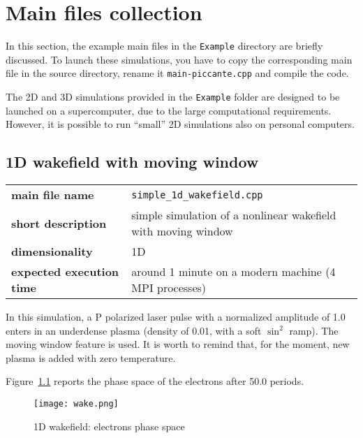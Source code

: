 \documentclass[11pt,a4paper]{report}
\begin{document}
\chapter{Main files collection}
In this section, the example main files in the \verb+Example+ directory are briefly discussed. To launch these simulations, you have to copy the corresponding main file in the source directory, rename it \verb+main-piccante.cpp+ and compile the code.

The 2D and 3D simulations provided in the \verb+Example+ folder are designed to be launched on a supercomputer, due to the large computational requirements. However, it is possible to run ``small'' 2D simulations also on personal computers.

\section{1D wakefield with moving window}
\begin{center}
    \begin{tabular}{ l l }
    	\textbf{main file name}           & \verb+simple_1d_wakefield.cpp+                                  \\
    	\textbf{short description}        & simple simulation of a nonlinear wakefield with moving window   \\
    	\textbf{dimensionality}           & 1D                                                              \\
    	\textbf{expected execution time}  & around 1 minute on a modern machine (4 MPI processes)
    \end{tabular}
\end{center}
In this simulation, a P polarized laser pulse with a normalized amplitude of 1.0 enters in an underdense plasma (density of 0.01, with a soft $\sin^2$ ramp). The moving window feature is used. It is worth to remind that, for the moment, new plasma is added with zero temperature.

Figure~\ref{pic_1dwake} reports the phase space of the electrons after 50.0 periods.

    \begin{figure}[htbp]
    \centering
    \texttt{[image: wake.png]}
    \caption{1D wakefield: electrons phase space}\label{pic_1dwake}
    \end{figure}
\end{document}
